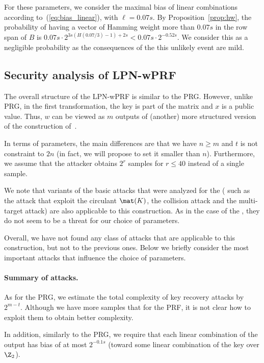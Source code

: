 For these parameters, we consider the maximal bias of linear combinations according to~(\ref{eq:bias_linear}),
with $\ell = 0.07 s$.
By Proposition~\ref{prop:hw},
the probability of having a vector of Hamming weight more than $0.07 s$
in the row span of $B$ is
$0.07 s \cdot 2^{3s (H(0.07/3) - 1) + 2s} < 0.07 s \cdot 2^{-0.52 s}$.
We consider this as a negligible probability
as the consequences of the this unlikely event are mild.


\subsection{Security analysis of LPN-wPRF}

The overall structure of the LPN-wPRF is similar to the PRG.
However, unlike PRG, in the first transformation, the key is part of the matrix and
$x$ is a public value.
Thus, $w$ can be viewed as $m$ outputs of (another) more
structured version of the construction of~\cite{boneh2018-darkmatter}.

In terms of parameters, the main differences are that we have $n \geq m$
and $t$ is not constraint to $2n$ (in fact, we will propose to set it smaller than $n$).
Furthermore, we assume that the attacker obtains $2^r$ samples for $r \leq 40$ instead of a single sample.

We note that variants of the basic attacks that were analyzed for the \ttwPRF (
such as the attack that exploit the circulant $\mat(K)$, the collision attack
and the multi-target attack) are also applicable to this construction.
As in the case of the \ttwPRF,
they do not seem to be a threat for our choice of parameters.

Overall, we have not found any class of attacks that are
applicable to this construction, but not to the previous ones.
Below we briefly consider the most important attacks that influence the
choice of parameters.

\paragraph{Summary of attacks.}
As for the PRG, we estimate the total complexity of key recovery attacks by $2^{m - t}$.
Although we have more samples that for the PRF,
it is not clear how to exploit them to obtain better complexity.

In addition, similarly to the PRG,
we require that each linear combination of the output
has bias of at most $2^{-0.1 s}$
(toward some linear combination of the key over $\Z_2$).

